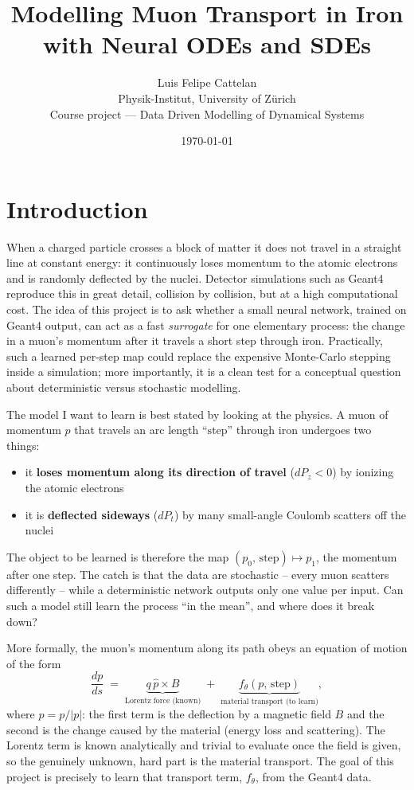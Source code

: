 \documentclass[11pt]{article}
\title{\vspace{-2em}Modelling Muon Transport in Iron\\ with Neural ODEs and SDEs}
\author{Luis Felipe Cattelan \\[2pt]
        \small Physik-Institut, University of Z\"urich \\[1pt]
        \small Course project --- Data Driven Modelling of Dynamical Systems}
\date{\today}
\begin{document}
\maketitle
\thispagestyle{fancy}

\section{Introduction}
When a charged particle crosses a block of matter it does not travel in a
straight line at constant energy: it continuously loses momentum to the atomic
electrons and is randomly deflected by the nuclei. Detector simulations such as
Geant4 reproduce this in great detail, collision by collision, but at a high
computational cost. The idea of this project is to ask whether a small neural
network, trained on Geant4 output, can act as a fast \emph{surrogate} for one
elementary process: the change in a muon's momentum after it travels a short
step through iron. Practically, such a learned per-step map could replace the
expensive Monte-Carlo stepping inside a simulation; more importantly, it is a clean test for a conceptual question about deterministic
versus stochastic modelling.

The model I want to learn is best stated by looking at the physics. A muon of
momentum $p$ that travels an arc length ``$\mathrm{step}$'' through iron undergoes
two things:
\begin{itemize}
  \item it \textbf{loses momentum along its direction of travel} ($dP_z<0$) by
  ionizing the atomic electrons
  \item it is \textbf{deflected sideways} ($dP_t$) by many small-angle Coulomb
  scatters off the nuclei
\end{itemize}
The object to be learned is therefore the map
$(p_0,\,\mathrm{step})\mapsto p_1$, the momentum after one step. The catch is that
the data are stochastic -- every muon scatters differently -- while a
deterministic network outputs only one value per input. Can such a model still
learn the process ``in the mean'', and where does it break down?

More formally, the muon's momentum along its path obeys an equation of motion of
the form
\begin{equation}
  \frac{dp}{ds} \;=\;
  \underbrace{q\,\hat{p}\times B}_{\text{Lorentz force (known)}}
  \;+\;
  \underbrace{f_\theta(p,\,\mathrm{step})}_{\text{material transport (to learn)}},
  \label{eq:eom}
\end{equation}
where $\hat p=p/|p|$: the first term is the deflection by a magnetic field $B$ and
the second is the change caused by the material (energy loss and scattering). The
Lorentz term is known analytically and trivial to evaluate once the field is given, so the genuinely unknown, hard
part is the material transport. The goal of this project is precisely to learn
that transport term, $f_\theta$, from the Geant4 data.
\end{document}
